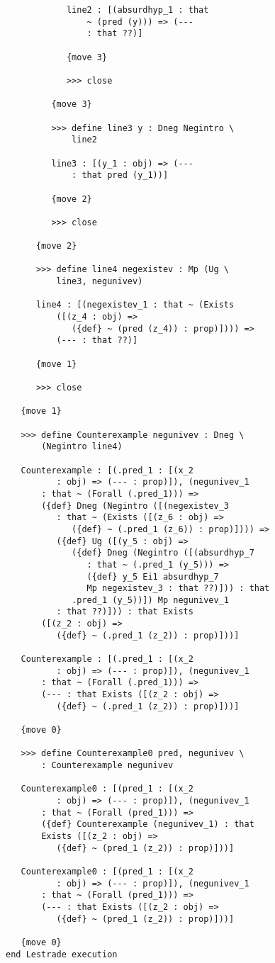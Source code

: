 \documentclass[12pt]{article}
\begin{document}
\begin{verbatim}
            line2 : [(absurdhyp_1 : that 
                ~ (pred (y))) => (--- 
                : that ??)]

            {move 3}

            >>> close

         {move 3}

         >>> define line3 y : Dneg Negintro \
             line2

         line3 : [(y_1 : obj) => (--- 
             : that pred (y_1))]

         {move 2}

         >>> close

      {move 2}

      >>> define line4 negexistev : Mp (Ug \
          line3, negunivev)

      line4 : [(negexistev_1 : that ~ (Exists 
          ([(z_4 : obj) => 
             ({def} ~ (pred (z_4)) : prop)]))) => 
          (--- : that ??)]

      {move 1}

      >>> close

   {move 1}

   >>> define Counterexample negunivev : Dneg \
       (Negintro line4)

   Counterexample : [(.pred_1 : [(x_2 
          : obj) => (--- : prop)]), (negunivev_1 
       : that ~ (Forall (.pred_1))) => 
       ({def} Dneg (Negintro ([(negexistev_3 
          : that ~ (Exists ([(z_6 : obj) => 
             ({def} ~ (.pred_1 (z_6)) : prop)]))) => 
          ({def} Ug ([(y_5 : obj) => 
             ({def} Dneg (Negintro ([(absurdhyp_7 
                : that ~ (.pred_1 (y_5))) => 
                ({def} y_5 Ei1 absurdhyp_7 
                Mp negexistev_3 : that ??)])) : that 
             .pred_1 (y_5))]) Mp negunivev_1 
          : that ??)])) : that Exists 
       ([(z_2 : obj) => 
          ({def} ~ (.pred_1 (z_2)) : prop)]))]

   Counterexample : [(.pred_1 : [(x_2 
          : obj) => (--- : prop)]), (negunivev_1 
       : that ~ (Forall (.pred_1))) => 
       (--- : that Exists ([(z_2 : obj) => 
          ({def} ~ (.pred_1 (z_2)) : prop)]))]

   {move 0}

   >>> define Counterexample0 pred, negunivev \
       : Counterexample negunivev

   Counterexample0 : [(pred_1 : [(x_2 
          : obj) => (--- : prop)]), (negunivev_1 
       : that ~ (Forall (pred_1))) => 
       ({def} Counterexample (negunivev_1) : that 
       Exists ([(z_2 : obj) => 
          ({def} ~ (pred_1 (z_2)) : prop)]))]

   Counterexample0 : [(pred_1 : [(x_2 
          : obj) => (--- : prop)]), (negunivev_1 
       : that ~ (Forall (pred_1))) => 
       (--- : that Exists ([(z_2 : obj) => 
          ({def} ~ (pred_1 (z_2)) : prop)]))]

   {move 0}
end Lestrade execution
\end{verbatim}
\end{document}
